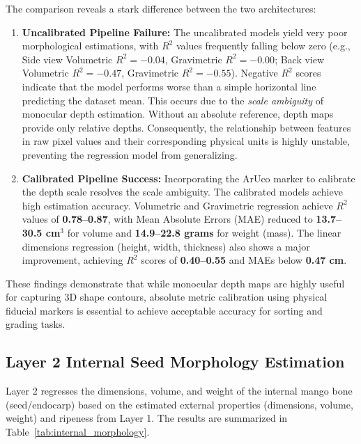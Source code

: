 The comparison reveals a stark difference between the two architectures:
\begin{enumerate}
    \item \textbf{Uncalibrated Pipeline Failure:} The uncalibrated models yield very poor
    morphological estimations, with $R^2$ values frequently falling below zero (e.g., Side
    view Volumetric $R^2 = -0.04$, Gravimetric $R^2 = -0.00$; Back view Volumetric $R^2 = -0.47$,
    Gravimetric $R^2 = -0.55$). Negative $R^2$ scores indicate that the model performs worse
    than a simple horizontal line predicting the dataset mean. This occurs due to the
    \textit{scale ambiguity} of monocular depth estimation. Without an absolute reference,
    depth maps provide only relative depths. Consequently, the relationship between features in
    raw pixel values and their corresponding physical units is highly unstable, preventing the
    regression model from generalizing.
    \item \textbf{Calibrated Pipeline Success:} Incorporating the ArUco marker to calibrate
    the depth scale resolves the scale ambiguity. The calibrated models achieve high estimation
    accuracy. Volumetric and Gravimetric regression achieve $R^2$ values of \textbf{0.78--0.87},
    with Mean Absolute Errors (MAE) reduced to \textbf{13.7--30.5 cm$^3$} for volume and
    \textbf{14.9--22.8 grams} for weight (mass). The linear dimensions regression (height, width,
    thickness) also shows a major improvement, achieving $R^2$ scores of \textbf{0.40--0.55}
    and MAEs below \textbf{0.47 cm}.
\end{enumerate}

These findings demonstrate that while monocular depth maps are highly useful for capturing
3D shape contours, absolute metric calibration using physical fiducial markers is essential
to achieve acceptable accuracy for sorting and grading tasks.

\subsection{Layer 2 Internal Seed Morphology Estimation}
Layer 2 regresses the dimensions, volume, and weight of the internal mango bone (seed/endocarp) based on the estimated external properties (dimensions, volume, weight) and ripeness from Layer 1. The results are summarized in Table~\ref{tab:internal_morphology}.

